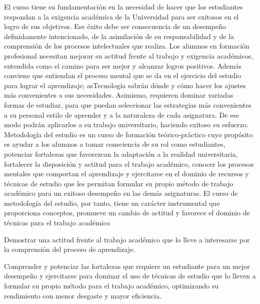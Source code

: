 \begin{syllabus}


\begin{justification}
El curso tiene su fundamentación en la necesidad de hacer que los estudiantes respondan a la exigencia académica de la Universidad para ser exitosos en el logro de sus objetivos. Ese  éxito debe ser consecuencia de un desempeño definidamente intencionado, de la asimilación de su responsabilidad y de la comprensión de los procesos intelectuales que realiza. 
Los alumnos en formación profesional necesitan mejorar su actitud frente al trabajo y exigencia académicos, entendida como el camino para ser mejor y alcanzar logros positivos. Además conviene que entiendan el proceso mental que se da en el ejercicio del estudio para lograr el aprendizaje; asTecnología  sabrán dónde y cómo hacer los ajustes más convenientes a sus necesidades. Asimismo, requieren dominar variadas formas de estudiar, para que puedan seleccionar las estrategias  más convenientes a su personal estilo de aprender y a la naturaleza de cada asignatura. De ese modo podrán  aplicarlos a su trabajo universitario, haciendo exitoso su esfuerzo.
Metodología del estudio es un curso de formación teórico-práctico cuyo propósito es  ayudar a los alumnos a  tomar consciencia de su rol como estudiantes, potenciar fortalezas que favorezcan la adaptación a la realidad universitaria, fortalecer la disposición y actitud para el trabajo académico, conocer los procesos mentales que comportan el aprendizaje  y ejercitarse en el dominio de recursos y técnicas de estudio que les permitan formular su propio método de trabajo académico para un exitoso desempeño en las demás asignaturas. El curso de metodología del estudio, por tanto, tiene un carácter instrumental que proporciona conceptos, promueve un cambio de actitud y favorece el dominio de técnicas para el  trabajo académico

\end{justification}

\begin{goals}
\item Demostrar una actitud frente al trabajo académico que lo lleve a interesarse por la comprensión del proceso de aprendizaje.
\item Comprender y potenciar las fortalezas que requiere un estudiante para  un mejor desempeño  y ejercitarse para dominar el uso de  técnicas de estudio que lo lleven a formular su propio método para el trabajo académico, optimizando su rendimiento con menor desgaste y mayor eficiencia.
\end{goals}


\end{syllabus}
